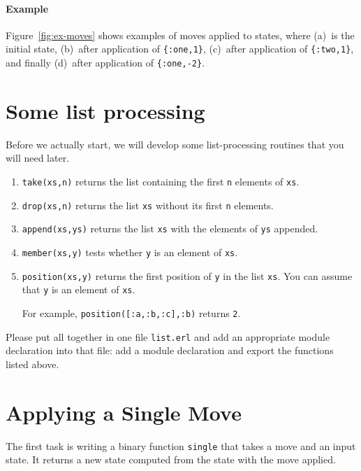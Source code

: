 \documentclass[a4paper,11pt]{article}
\begin{document}
\paragraph{Example}

Figure~\ref{fig:ex-moves} shows examples of moves applied to
states, where (a)~is the initial state, (b)~after application of
\verb+{:one,1}+, (c)~after application of \verb+{:two,1}+, and finally
(d)~after application of \verb+{:one,-2}+.

\section{Some list processing}

Before we actually start, we will develop some list-processing
routines that you will need later.
\begin{enumerate}

\item \verb+take(xs,n)+ returns the list containing the first \verb+n+
  elements of \verb+xs+.

\item \verb+drop(xs,n)+ returns the list \verb+xs+ without its first
  \verb+n+ elements.

\item \verb+append(xs,ys)+ returns the list \verb+xs+ with the elements
  of \verb+ys+ appended.
  
\item \verb+member(xs,y)+ tests whether \verb+y+ is an element of \verb+xs+.

\item \verb+position(xs,y)+ returns the first position of \verb+y+ in
  the list \verb+xs+. You can assume that \verb+y+ is an element of
  \verb+xs+.

  For example, \verb+position([:a,:b,:c],:b)+ returns \verb+2+.
\end{enumerate}

Please put all together in one file \verb+list.erl+ and add an
appropriate module declaration into that file: add a module
declaration and export the functions listed above.

\section{Applying a Single Move}

The first task is writing a binary function \verb+single+ that
takes a move and an input state. It returns a
new state computed from the state with the move applied.
\end{document}
